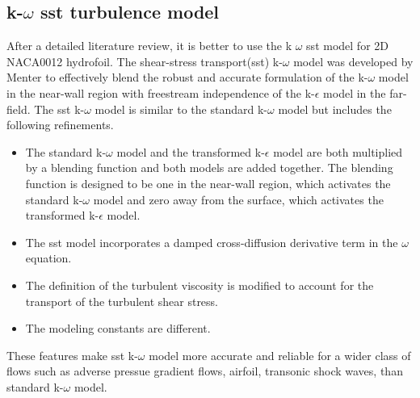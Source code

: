 \subsection{k-$\omega$ sst turbulence model}
After a detailed literature review, it is better to use the k $\omega$ sst model for 2D NACA0012 hydrofoil\cite{Zhao2021,ANSYS}. The shear-stress transport(sst) k-$\omega$ model was developed by Menter to effectively 
blend the robust and accurate formulation of the k-$\omega$ model in the near-wall region with freestream independence of the k-$\epsilon$ model in the far-field. The sst k-$\omega$ model is similar to the 
standard k-$\omega$ model but includes the following refinements.
\begin{itemize}
\item The standard k-$\omega$ model and the transformed k-$\epsilon$ model are both multiplied by a blending function and both models are added together. The blending function is designed to be one in the 
near-wall region, which activates the standard k-$\omega$ model and zero away from the surface, which activates the transformed k-$\epsilon$ model.
\item The sst model incorporates a damped cross-diffusion derivative term in the $\omega$ equation.
\item The definition of the turbulent viscosity is modified to account for the transport of the turbulent shear stress.
\item The modeling constants are different.
\end{itemize}
These features make sst k-$\omega$ model more accurate and reliable for a wider class of flows such as adverse pressue gradient flows, airfoil, transonic shock waves, than standard k-$\omega$ model.
